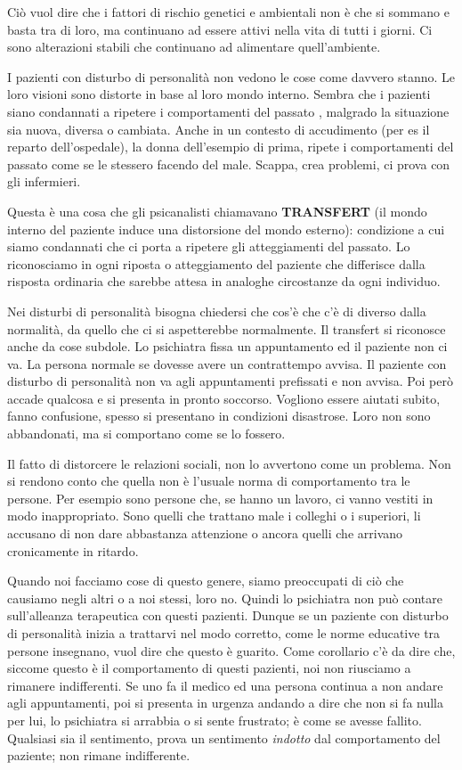 \documentclass[]{article}
\begin{document}
Ciò vuol dire che i fattori di rischio genetici e ambientali non è che
si sommano e basta tra di loro, ma continuano ad essere attivi nella
vita di tutti i giorni. Ci sono alterazioni stabili che continuano ad
alimentare quell'ambiente.

I pazienti con disturbo di personalità non vedono le cose come davvero
stanno. Le loro visioni sono distorte in base al loro mondo interno.
Sembra che i pazienti siano condannati a ripetere i comportamenti del
passato , malgrado la situazione sia nuova, diversa o cambiata. Anche in
un contesto di accudimento (per es il reparto dell'ospedale), la donna
dell'esempio di prima, ripete i comportamenti del passato come se le
stessero facendo del male. Scappa, crea problemi, ci prova con gli
infermieri.

Questa è una cosa che gli psicanalisti chiamavano \textbf{TRANSFERT} (il
mondo interno del paziente induce una distorsione del mondo esterno):
condizione a cui siamo condannati che ci porta a ripetere gli
atteggiamenti del passato. Lo riconosciamo in ogni riposta o
atteggiamento del paziente che differisce dalla risposta ordinaria che
sarebbe attesa in analoghe circostanze da ogni individuo.

Nei disturbi di personalità bisogna chiedersi che cos'è che c'è di
diverso dalla normalità, da quello che ci si aspetterebbe normalmente.
Il transfert si riconosce anche da cose subdole. Lo psichiatra fissa un
appuntamento ed il paziente non ci va. La persona normale se dovesse
avere un contrattempo avvisa. Il paziente con disturbo di personalità
non va agli appuntamenti prefissati e non avvisa. Poi però accade
qualcosa e si presenta in pronto soccorso. Vogliono essere aiutati
subito, fanno confusione, spesso si presentano in condizioni disastrose.
Loro non sono abbandonati, ma si comportano come se lo fossero.

Il fatto di distorcere le relazioni sociali, non lo avvertono come un
problema. Non si rendono conto che quella non è l'usuale norma di
comportamento tra le persone. Per esempio sono persone che, se hanno un
lavoro, ci vanno vestiti in modo inappropriato. Sono quelli che trattano
male i colleghi o i superiori, li accusano di non dare abbastanza
attenzione o ancora quelli che arrivano cronicamente in ritardo.

Quando noi facciamo cose di questo genere, siamo preoccupati di ciò che
causiamo negli altri o a noi stessi, loro no. Quindi lo psichiatra non
può contare sull'alleanza terapeutica con questi pazienti. Dunque se un
paziente con disturbo di personalità inizia a trattarvi nel modo
corretto, come le norme educative tra persone insegnano, vuol dire che
questo è guarito. Come corollario c'è da dire che, siccome questo è il
comportamento di questi pazienti, noi non riusciamo a rimanere
indifferenti. Se uno fa il medico ed una persona continua a non andare
agli appuntamenti, poi si presenta in urgenza andando a dire che non si
fa nulla per lui, lo psichiatra si arrabbia o si sente frustrato; è come
se avesse fallito. Qualsiasi sia il sentimento, prova un sentimento
\emph{indotto} dal comportamento del paziente; non rimane indifferente.
\end{document}
